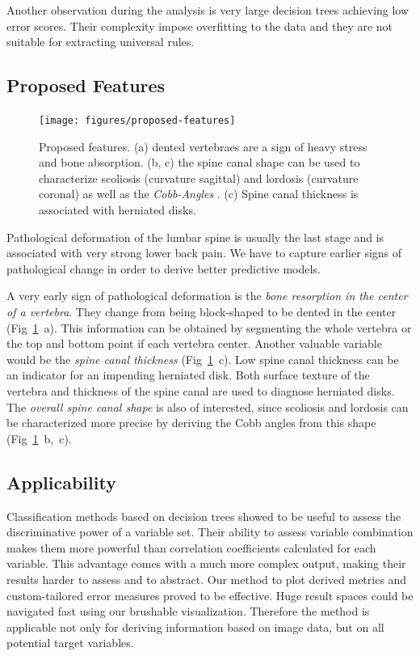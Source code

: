 \documentclass[a4paper,twoside]{style/article}
\begin{document}
Another observation during the analysis is very large decision trees achieving low error scores.
Their complexity impose overfitting to the data and they are not suitable for extracting universal rules.
\subsection{Proposed Features}
\label{sec:ProposedFeatures}
\begin{figure}[!h]
  \centering
  \texttt{[image: figures/proposed-features]}
  \caption{
	Proposed features.
	(a) dented vertebraes are a sign of heavy stress and bone absorption.
	(b, c) the spine canal shape can be used to characterize scoliosis (curvature sagittal) and lordosis (curvature coronal) as well as the \emph{Cobb-Angles} \cite{Cobb}.
	(c) Spine canal thickness is associated with herniated disks.
	}
  \label{fig:proposedFeatures}
\end{figure}
\noindent Pathological deformation of the lumbar spine is usually the last stage and is associated with very strong lower back pain.
We have to capture earlier signs of pathological change in order to derive better predictive models.

A very early sign of pathological deformation is the \emph{bone resorption in the center of a vertebra}.
They change from being block-shaped to be dented in the center (Fig~\ref{fig:proposedFeatures}~a).
This information can be obtained by segmenting the whole vertebra or the top and bottom point if each vertebra center.
Another valuable variable would be the \emph{spine canal thickness} (Fig~\ref{fig:proposedFeatures}~c).
Low spine canal thickness can be an indicator for an impending herniated disk.
Both surface texture of the vertebra and thickness of the spine canal are used to diagnose herniated disks.
The \emph{overall spine canal shape} is also of interested, since scoliosis and lordosis can be characterized more precise by deriving the Cobb angles from this shape (Fig~\ref{fig:proposedFeatures}~b,~c).
\subsection{Applicability}
Classification methods based on decision trees showed to be useful to assess the discriminative power of a variable set.
Their ability to assess variable combination makes them more powerful than correlation coefficients calculated for each variable.
This advantage comes with a much more complex output, making their results harder to assess and to abstract.
Our method to plot derived metrics and custom-tailored error measures proved to be effective.
Huge result spaces could be navigated fast using our brushable visualization.
Therefore the method is applicable not only for deriving information based on image data, but on all potential target variables.
\end{document}
